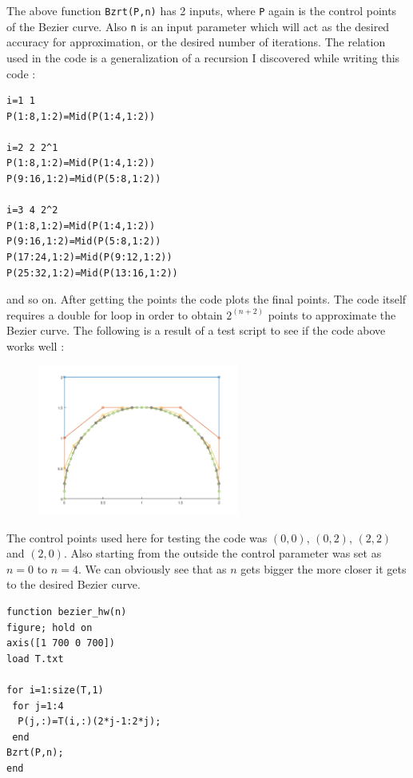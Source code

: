 \documentclass[paper=a4, fontsize=11pt]{scrartcl}
\begin{document}
The above function \texttt{Bzrt(P,n)} has 2 inputs, where \texttt{P} again is the control points of the Bezier curve. Also \texttt{n} is an input parameter which will act as the desired accuracy for approximation, or the desired number of iterations. The relation used in the code is a generalization of a recursion I discovered while writing this code : \\

\begin{verbatim}
i=1 1
P(1:8,1:2)=Mid(P(1:4,1:2))

i=2 2 2^1
P(1:8,1:2)=Mid(P(1:4,1:2))
P(9:16,1:2)=Mid(P(5:8,1:2))

i=3 4 2^2
P(1:8,1:2)=Mid(P(1:4,1:2))
P(9:16,1:2)=Mid(P(5:8,1:2))
P(17:24,1:2)=Mid(P(9:12,1:2))
P(25:32,1:2)=Mid(P(13:16,1:2))
\end{verbatim}

and so on. After getting the points the code plots the final points. The code itself requires a double for loop in order to obtain $2^{(n+2)}$ points to approximate the Bezier curve. The following is a result of a test script to see if the code above works well : \\

\begin{figure}[htb]
\centering
\includegraphics[width=250px]{./img/test4.png}
\end{figure}

The control points used here for testing the code was $(0,0)$, $(0,2)$, $(2,2)$ and $(2,0)$. Also starting from the outside the control parameter was set as $n=0$ to $n=4$. We can obviously see that as $n$ gets bigger the more closer it gets to the desired Bezier curve.\\

\begin{lstlisting}[caption='bezier\_hw.m']
function bezier_hw(n)
figure; hold on
axis([1 700 0 700])
load T.txt

for i=1:size(T,1)
 for j=1:4
  P(j,:)=T(i,:)(2*j-1:2*j);
 end
Bzrt(P,n);
end
\end{lstlisting}
\vspace{0.15in}
\end{document}

